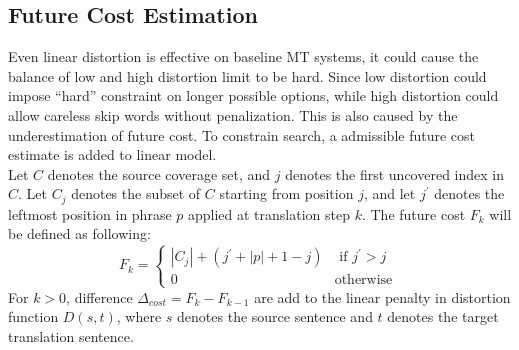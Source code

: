 \documentclass[11pt,letterpaper]{article}
\begin{document}
\subsection{Future Cost Estimation} %
\label{sub:future_cost_estimation}
Even linear distortion is effective on baseline MT systems, it could cause the balance of low and high distortion limit to be hard. Since low distortion could impose ``hard'' constraint on longer possible options, while high distortion could allow careless skip words without penalization. This is also caused by the underestimation of future cost. To constrain search, a admissible future cost estimate is added to linear model.\\
Let $C$ denotes the source coverage set, and $j$ denotes the first uncovered index in $C$. Let $C_j$ denotes the subset of $C$ starting from position $j$, and let $j^{\prime}$ denotes the leftmost position in phrase $p$ applied at translation step $k$. The future cost $F_k$ will be defined as following:
$$ F_k = \begin{cases}
  |C_j| + (j^{\prime} + |p| + 1 - j) & \text{ if $j^{\prime} > j$ }\\
  0 & \text{otherwise}
 \end{cases} $$
 For $k>0$, difference $\Delta_{cost} = F_k - F_{k-1}$ are add to the linear penalty in distortion function $D(s,t)$, where $s$ denotes the source sentence and $t$ denotes the target translation sentence.
\end{document}
